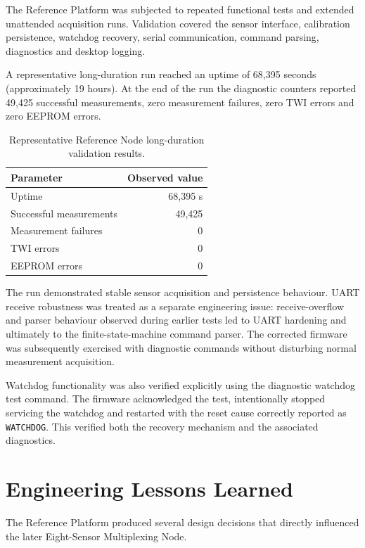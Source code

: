 The Reference Platform was subjected to repeated functional tests and extended unattended acquisition runs. Validation covered the sensor interface, calibration persistence, watchdog recovery, serial communication, command parsing, diagnostics and desktop logging.

A representative long-duration run reached an uptime of 68,395 seconds (approximately 19 hours). At the end of the run the diagnostic counters reported 49,425 successful measurements, zero measurement failures, zero TWI errors and zero EEPROM errors.

\begin{table}[htbp]
\centering
\caption{Representative Reference Node long-duration validation results.}
\label{tab:reference-validation}
\begin{tabular}{lr}
\toprule
Parameter & Observed value \\
\midrule
Uptime & 68,395 s \\
Successful measurements & 49,425 \\
Measurement failures & 0 \\
TWI errors & 0 \\
EEPROM errors & 0 \\
\bottomrule
\end{tabular}
\end{table}

The run demonstrated stable sensor acquisition and persistence behaviour. UART receive robustness was treated as a separate engineering issue: receive-overflow and parser behaviour observed during earlier tests led to UART hardening and ultimately to the finite-state-machine command parser. The corrected firmware was subsequently exercised with diagnostic commands without disturbing normal measurement acquisition.

Watchdog functionality was also verified explicitly using the diagnostic watchdog test command. The firmware acknowledged the test, intentionally stopped servicing the watchdog and restarted with the reset cause correctly reported as \texttt{WATCHDOG}. This verified both the recovery mechanism and the associated diagnostics.

\section{Engineering Lessons Learned}

The Reference Platform produced several design decisions that directly influenced the later Eight-Sensor Multiplexing Node.

